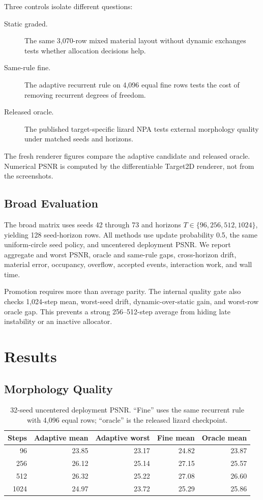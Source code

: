 \documentclass[sigconf,nonacm]{acmart}
\begin{document}
Three controls isolate different questions:
\begin{description}
  \item[Static graded.] The same 3,070-row mixed material layout without
  dynamic exchanges tests whether allocation decisions help.
  \item[Same-rule fine.] The adaptive recurrent rule on 4,096 equal fine rows
  tests the cost of removing recurrent degrees of freedom.
  \item[Released oracle.] The published target-specific lizard NPA tests
  external morphology quality under matched seeds and horizons.
\end{description}
The fresh renderer figures compare the adaptive candidate and released oracle.
Numerical PSNR is computed by the differentiable Target2D renderer, not from
the screenshots.

\subsection{Broad Evaluation}

The broad matrix uses seeds 42 through 73 and horizons
$T\in\{96,256,512,1024\}$, yielding 128 seed-horizon rows. All methods use
update probability 0.5, the same uniform-circle seed policy, and uncentered
deployment PSNR. We report aggregate and worst PSNR, oracle and same-rule
gaps, cross-horizon drift, material error, occupancy, overflow, accepted
events, interaction work, and wall time.

Promotion requires more than average parity. The internal quality gate also
checks 1,024-step mean, worst-seed drift, dynamic-over-static gain, and
worst-row oracle gap. This prevents a strong 256--512-step average from hiding
late instability or an inactive allocator.

\section{Results}

\subsection{Morphology Quality}

\begin{table}[t]
\caption{32-seed uncentered deployment PSNR. ``Fine'' uses the same recurrent
rule with 4,096 equal rows; ``oracle'' is the released lizard checkpoint.}
\label{tab:quality}
\centering
\small
\begin{tabular}{rrrrr}
\toprule
Steps & Adaptive mean & Adaptive worst & Fine mean & Oracle mean \\
\midrule
96   & 23.85 & 23.17 & 24.82 & 23.87 \\
256  & 26.12 & 25.14 & 27.15 & 25.57 \\
512  & 26.32 & 25.22 & 27.08 & 26.60 \\
1024 & 24.97 & 23.72 & 25.29 & 25.86 \\
\bottomrule
\end{tabular}
\end{table}
\end{document}
